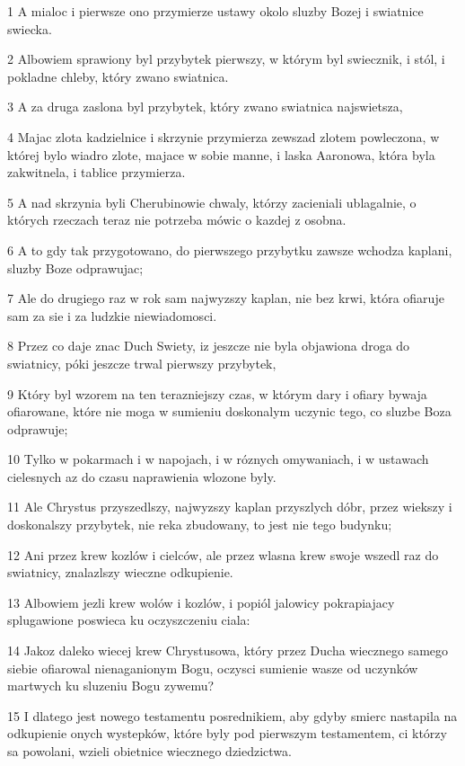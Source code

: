 \par 1 A mialoc i pierwsze ono przymierze ustawy okolo sluzby Bozej i swiatnice swiecka.
\par 2 Albowiem sprawiony byl przybytek pierwszy, w którym byl swiecznik, i stól, i pokladne chleby, który zwano swiatnica.
\par 3 A za druga zaslona byl przybytek, który zwano swiatnica najswietsza,
\par 4 Majac zlota kadzielnice i skrzynie przymierza zewszad zlotem powleczona, w której bylo wiadro zlote, majace w sobie manne, i laska Aaronowa, która byla zakwitnela, i tablice przymierza.
\par 5 A nad skrzynia byli Cherubinowie chwaly, którzy zacieniali ublagalnie, o których rzeczach teraz nie potrzeba mówic o kazdej z osobna.
\par 6 A to gdy tak przygotowano, do pierwszego przybytku zawsze wchodza kaplani, sluzby Boze odprawujac;
\par 7 Ale do drugiego raz w rok sam najwyzszy kaplan, nie bez krwi, która ofiaruje sam za sie i za ludzkie niewiadomosci.
\par 8 Przez co daje znac Duch Swiety, iz jeszcze nie byla objawiona droga do swiatnicy, póki jeszcze trwal pierwszy przybytek,
\par 9 Który byl wzorem na ten terazniejszy czas, w którym dary i ofiary bywaja ofiarowane, które nie moga w sumieniu doskonalym uczynic tego, co sluzbe Boza odprawuje;
\par 10 Tylko w pokarmach i w napojach, i w róznych omywaniach, i w ustawach cielesnych az do czasu naprawienia wlozone byly.
\par 11 Ale Chrystus przyszedlszy, najwyzszy kaplan przyszlych dóbr, przez wiekszy i doskonalszy przybytek, nie reka zbudowany, to jest nie tego budynku;
\par 12 Ani przez krew kozlów i cielców, ale przez wlasna krew swoje wszedl raz do swiatnicy, znalazlszy wieczne odkupienie.
\par 13 Albowiem jezli krew wolów i kozlów, i popiól jalowicy pokrapiajacy splugawione poswieca ku oczyszczeniu ciala:
\par 14 Jakoz daleko wiecej krew Chrystusowa, który przez Ducha wiecznego samego siebie ofiarowal nienaganionym Bogu, oczysci sumienie wasze od uczynków martwych ku sluzeniu Bogu zywemu?
\par 15 I dlatego jest nowego testamentu posrednikiem, aby gdyby smierc nastapila na odkupienie onych wystepków, które byly pod pierwszym testamentem, ci którzy sa powolani, wzieli obietnice wiecznego dziedzictwa.
